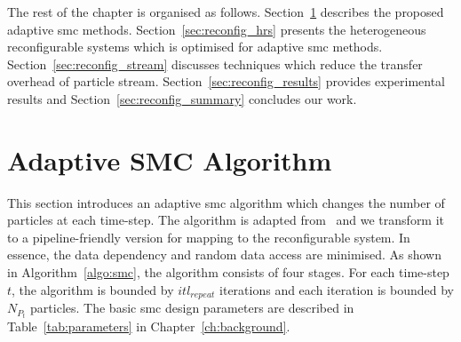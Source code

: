 The rest of the chapter is organised as follows.
Section~\ref{sec:reconfig_asmc} describes the proposed adaptive \gls{smc} methods.
Section~\ref{sec:reconfig_hrs} presents the heterogeneous reconfigurable systems which is optimised for adaptive \gls{smc} methods.
Section~\ref{sec:reconfig_stream} discusses techniques which reduce the transfer overhead of particle stream.
Section~\ref{sec:reconfig_results} provides experimental results and
Section~\ref{sec:reconfig_summary} concludes our work.

\section{Adaptive SMC Algorithm}
\label{sec:reconfig_asmc}

This section introduces an adaptive \gls{smc} algorithm which changes the number of particles at each time-step.
The algorithm is adapted from~\cite{liu07} and we transform it to a pipeline-friendly version for mapping to the reconfigurable system.
In essence, the data dependency and random data access are minimised.
As shown in Algorithm~\ref{algo:smc}, the algorithm consists of four stages.
For each time-step $t$, the algorithm is bounded by $itl_{repeat}$ iterations and each iteration is bounded by $N_{P_t}$ particles.
The basic \gls{smc} design parameters are described in Table~\ref{tab:parameters} in Chapter~\ref{ch:background}.

